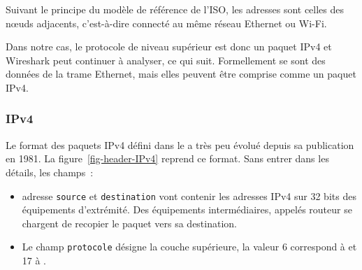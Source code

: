   \vspace{1em}

Suivant le principe du modèle de référence de l'ISO, les adresses sont celles des nœuds adjacents, c'est-à-dire connecté au même réseau Ethernet ou Wi-Fi.

  \vspace{1em}

Dans notre cas, le protocole de niveau supérieur est donc un paquet IPv4 et Wireshark peut continuer à analyser, ce qui suit. Formellement se sont des données de la trame Ethernet, mais elles peuvent être comprise comme un paquet IPv4.


\subsubsection{IPv4}

Le format des paquets IPv4 défini dans le  a très peu évolué depuis sa publication en 1981. La figure~\vref{fig-header-IPv4} reprend ce format. Sans entrer dans les détails, les champs~:

\begin{itemize}
    \item adresse \texttt{source} et \texttt{destination} vont contenir les adresses IPv4 sur 32 bits des équipements d'extrémité. Des équipements intermédiaires, appelés routeur se chargent de recopier le paquet vers sa destination.
    \item Le champ \texttt{protocole} désigne la couche supérieure, la valeur 6 correspond à  et 17 à .
\end{itemize}

